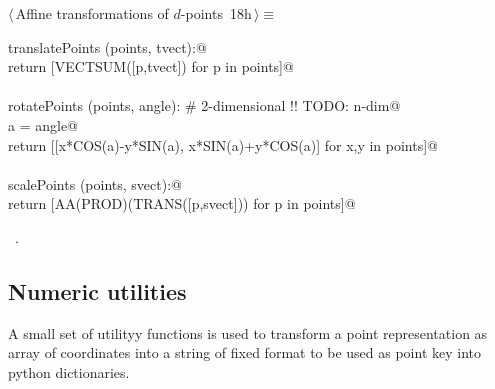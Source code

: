 \documentclass[11pt,oneside]{article}	%
\begin{document}
\begin{flushleft} \small \label{scrap48}
\protect{}$\langle\,$Affine transformations of $d$-points\nobreak\ {\footnotesize 18h}$\,\rangle\equiv$
\vspace{-1ex}
\begin{list}{}{} \item
\mbox{}\verb@def translatePoints (points, tvect):@\\
\mbox{}\verb@   return [VECTSUM([p,tvect]) for p in points]@\\
\mbox{}\verb@@\\
\mbox{}\verb@def rotatePoints (points, angle):      # 2-dimensional !! TODO: n-dim@\\
\mbox{}\verb@   a = angle@\\
\mbox{}\verb@   return [[x*COS(a)-y*SIN(a), x*SIN(a)+y*COS(a)] for x,y in points]@\\
\mbox{}\verb@@\\
\mbox{}\verb@def scalePoints (points, svect):@\\
\mbox{}\verb@   return [AA(PROD)(TRANS([p,svect])) for p in points]@\\
\mbox{}\verb@@{\NWsep}
\end{list}
\vspace{-1ex}
\footnotesize\addtolength{\baselineskip}{-1ex}
\begin{list}{}{\setlength{\itemsep}{-\parsep}\setlength{\itemindent}{-\leftmargin}}
\item \NWtxtMacroRefIn\ .
\end{list}
\end{flushleft}

\subsection{Numeric utilities}

A small set of utilityy functions is used to transform a point representation as array of coordinates into a string of fixed format to be used as point key into python dictionaries.
\end{document}
